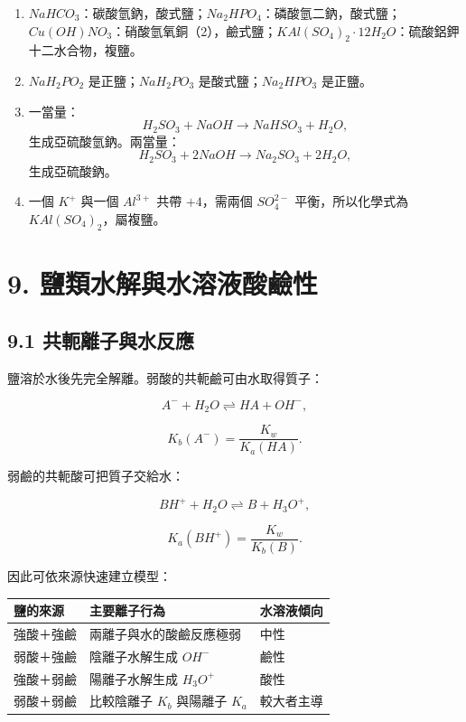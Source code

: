 \documentclass[11pt,a4paper]{article}
\newcounter{none}
\providecommand{\tightlist}{%
  \setlength{\itemsep}{0pt}\setlength{\parskip}{0pt}}
\begin{document}
\begin{enumerate}
\def\labelenumi{\arabic{enumi}.}
\tightlist
\item
  \(NaHCO_3\)：碳酸氫鈉，酸式鹽；\(Na_2HPO_4\)：磷酸氫二鈉，酸式鹽；\(Cu(OH)NO_3\)：硝酸氫氧銅（2），鹼式鹽；\(KAl(SO_4)_2\cdot12H_2O\)：硫酸鋁鉀十二水合物，複鹽。
\item
  \(NaH_2PO_2\) 是正鹽；\(NaH_2PO_3\) 是酸式鹽；\(Na_2HPO_3\) 是正鹽。
\item
  一當量：
  \[
  H_2SO_3+NaOH\rightarrow NaHSO_3+H_2O,
  \]
  生成亞硫酸氫鈉。兩當量：
  \[
  H_2SO_3+2NaOH\rightarrow Na_2SO_3+2H_2O,
  \]
  生成亞硫酸鈉。
\item
  一個 \(K^+\) 與一個 \(Al^{3+}\) 共帶 \(+4\)，需兩個 \(SO_4^{2-}\) 平衡，所以化學式為 \(KAl(SO_4)_2\)，屬複鹽。
\end{enumerate}

\section{9. 鹽類水解與水溶液酸鹼性}\label{ux9e7dux985eux6c34ux89e3ux8207ux6c34ux6eb6ux6db2ux9178ux9e7cux6027}

\subsection{9.1 共軛離子與水反應}\label{ux5171ux8edbux96e2ux5b50ux8207ux6c34ux53cdux61c9}

鹽溶於水後先完全解離。弱酸的共軛鹼可由水取得質子：

\[
A^-+H_2O\rightleftharpoons HA+OH^-,
\]

\[
K_b(A^-)=\frac{K_w}{K_a(HA)}.
\]

弱鹼的共軛酸可把質子交給水：

\[
BH^++H_2O\rightleftharpoons B+H_3O^+,
\]

\[
K_a(BH^+)=\frac{K_w}{K_b(B)}.
\]

因此可依來源快速建立模型：

{\def\LTcaptype{none} %
\begin{longtable}[]{@{}lll@{}}
\toprule\noalign{}
鹽的來源 & 主要離子行為 & 水溶液傾向 \\
\midrule\noalign{}
\endhead
\bottomrule\noalign{}
\endlastfoot
強酸＋強鹼 & 兩離子與水的酸鹼反應極弱 & 中性 \\
弱酸＋強鹼 & 陰離子水解生成 \(OH^-\) & 鹼性 \\
強酸＋弱鹼 & 陽離子水解生成 \(H_3O^+\) & 酸性 \\
弱酸＋弱鹼 & 比較陰離子 \(K_b\) 與陽離子 \(K_a\) & 較大者主導 \\
\end{longtable}
}
\end{document}
